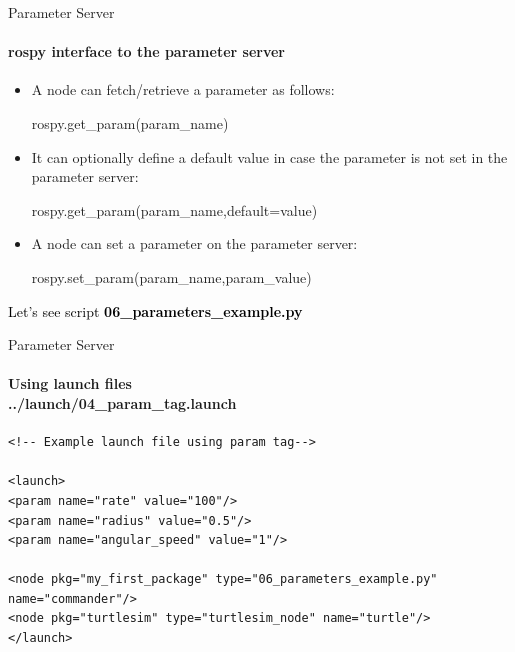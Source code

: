 \documentclass{beamer}
\begin{document}
\begin{frame}{Parameter Server}
    \framesubtitle{rospy interface to the parameter server}
    \begin{itemize}
        
        \item A node can fetch/retrieve a parameter as follows:
        
        
            \begin{focus}
                \centering
                \fontsize{9}{1} \ttfamily rospy.get\_param({\color{blue}param\_name})
            \end{focus}
       \item It can optionally define a default value in case the parameter is not set in the parameter server:
         \begin{focus}
             \centering
       \fontsize{9}{1} \ttfamily rospy.get\_param({\color{blue}param\_name},{\color{blue}default=value})
        \end{focus}
        
       \item A node can set a parameter on the parameter server:
       \begin{focus}
           \centering
           \fontsize{9}{1} \ttfamily rospy.set\_param({\color{blue}param\_name},{\color{blue}param\_value})
        \end{focus}
    \end{itemize}
\end{frame}




\begin{frame}[plain]{}  
    \centering
    {\huge \textcolor{black}{Let's see script \textbf{06\_parameters\_example.py}}}
\end{frame}




\begin{frame}[fragile]{Parameter Server}
    \framesubtitle{Using launch files\\
        \vspace{0.2cm}
        ../launch/04\_param\_tag.launch
    }
    \begin{lstlisting}
<!-- Example launch file using param tag-->

<launch>
<param name="rate" value="100"/>
<param name="radius" value="0.5"/>
<param name="angular_speed" value="1"/>

<node pkg="my_first_package" type="06_parameters_example.py" name="commander"/>
<node pkg="turtlesim" type="turtlesim_node" name="turtle"/>
</launch>
    \end{lstlisting}  
\end{frame}
\end{document}
